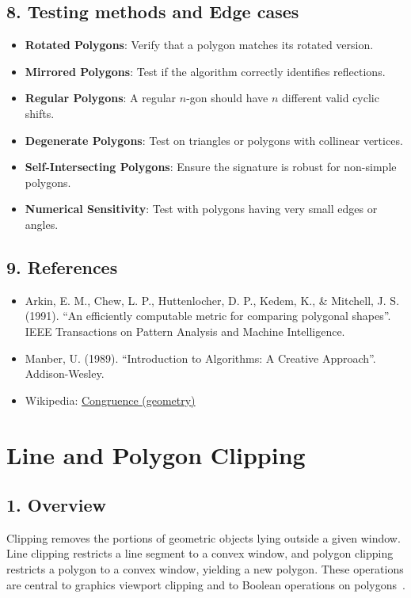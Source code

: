 \subsection{8. Testing methods and Edge cases}
\begin{itemize}
    \item \textbf{Rotated Polygons}: Verify that a polygon matches its rotated version.
    \item \textbf{Mirrored Polygons}: Test if the algorithm correctly identifies reflections.
    \item \textbf{Regular Polygons}: A regular $n$-gon should have $n$ different valid cyclic shifts.
    \item \textbf{Degenerate Polygons}: Test on triangles or polygons with collinear vertices.
    \item \textbf{Self-Intersecting Polygons}: Ensure the signature is robust for non-simple polygons.
    \item \textbf{Numerical Sensitivity}: Test with polygons having very small edges or angles.
\end{itemize}

\subsection{9. References}
\begin{itemize}
    \item Arkin, E. M., Chew, L. P., Huttenlocher, D. P., Kedem, K., \& Mitchell, J. S. (1991). ``An efficiently computable metric for comparing polygonal shapes''. IEEE Transactions on Pattern Analysis and Machine Intelligence.
    \item Manber, U. (1989). ``Introduction to Algorithms: A Creative Approach''. Addison-Wesley.
    \item Wikipedia: \href{https://en.wikipedia.org/wiki/Congruence_(geometry)}{Congruence (geometry)}
\end{itemize}

\section{Line and Polygon Clipping}
\label{sec:polygon_clipping}

\subsection{1. Overview}
Clipping removes the portions of geometric objects lying outside a given window. Line clipping restricts a line segment to a convex window, and polygon clipping restricts a polygon to a convex window, yielding a new polygon. These operations are central to graphics viewport clipping and to Boolean operations on polygons~\cite{sutherland1974,cyrus1978}.

